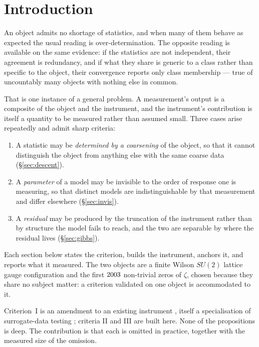 \documentclass[11pt]{article}
\theoremstyle{remark}
\begin{document}
\section{Introduction}

An object admits no shortage of statistics, and when many of them behave as expected the
usual reading is over-determination. The opposite reading is available on the same
evidence: if the statistics are not independent, their agreement is redundancy, and if
what they share is generic to a class rather than specific to the object, their
convergence reports only class membership --- true of uncountably many objects with
nothing else in common.

That is one instance of a general problem. A measurement's output is a composite of the
object and the instrument, and the instrument's contribution is itself a quantity to be
measured rather than assumed small. Three cases arise repeatedly and admit sharp
criteria:

\begin{enumerate}[leftmargin=2em,itemsep=2pt]
\item A statistic may be \emph{determined by a coarsening} of the object, so that it
      cannot distinguish the object from anything else with the same coarse data
      (\S\ref{sec:descent}).
\item A \emph{parameter} of a model may be invisible to the order of response one is
      measuring, so that distinct models are indistinguishable by that measurement and
      differ elsewhere (\S\ref{sec:invis}).
\item A \emph{residual} may be produced by the truncation of the instrument rather than
      by structure the model fails to reach, and the two are separable by where the
      residual lives (\S\ref{sec:gibbs}).
\end{enumerate}

Each section below states the criterion, builds the instrument, anchors it, and reports
what it measured. The two objects are a finite Wilson $SU(2)$ lattice gauge
configuration and the first $2003$ non-trivial zeros of $\zeta$, chosen because they
share no subject matter: a criterion validated on one object is accommodated to it.

Criterion~I is an amendment to an existing instrument \cite{ff06e}, itself a
specialisation of surrogate-data testing \cite{theiler}; criteria II and III are built
here. None of the propositions is deep. The contribution is that each is omitted in
practice, together with the measured size of the omission.
\end{document}

